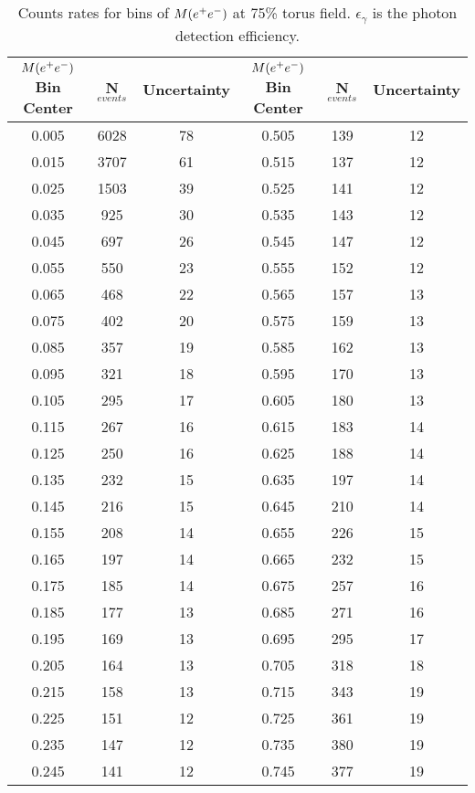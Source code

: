\begin{table}[h!]
\begin{center}
\footnotesize
\caption[Expected count rates]{\label{tab:counts}Counts rates for bins of $M(e^+e^-)$ at 75\% torus field. $\epsilon_\gamma$ is the photon detection efficiency.\vspace{0.75mm}}

\begin{tabular}{c|c|c||c|c|c}

\hline
$M(e^+e^-)$ Bin Center & N$_{events}$ & Uncertainty & $M(e^+e^-)$ Bin Center & N$_{events}$ & Uncertainty  \\
\hline
0.005 & 6028 & 78	&	0.505 & 139 & 12\\
0.015 & 3707 & 61	&	0.515 & 137 & 12\\
0.025 & 1503 & 39	&	0.525 & 141 & 12\\
0.035 & 925 & 30	&	0.535 & 143 & 12\\
0.045 & 697 & 26	&	0.545 & 147 & 12\\
0.055 & 550 & 23	&	0.555 & 152 & 12\\
0.065 & 468 & 22	&	0.565 & 157 & 13\\
0.075 & 402 & 20	&	0.575 & 159 & 13\\
0.085 & 357 & 19&	0.585 & 162 & 13\\
0.095 & 321 & 18&	0.595 & 170 & 13\\
0.105 & 295 & 17&	0.605 & 180 & 13\\
0.115 & 267 & 16&	0.615 & 183 & 14\\
0.125 & 250 & 16&	0.625 & 188 & 14\\
0.135 & 232 & 15&	0.635 & 197 & 14\\
0.145 & 216 & 15&	0.645 & 210 & 14\\
0.155 & 208 & 14&	0.655 & 226 & 15\\
0.165 & 197 & 14&	0.665 & 232 & 15\\
0.175 & 185 & 14&	0.675 & 257 & 16\\
0.185 & 177 & 13&	0.685 & 271 & 16\\
0.195 & 169 & 13&	0.695 & 295 & 17\\
0.205 & 164 & 13&	0.705 & 318 & 18\\
0.215 & 158 & 13&	0.715 & 343 & 19\\
0.225 & 151 & 12&	0.725 & 361 & 19\\
0.235 & 147 & 12&	0.735 & 380 & 19\\
0.245 & 141 & 12&	0.745 & 377 & 19\\

\end{tabular}
\end{center}
\end{table}
